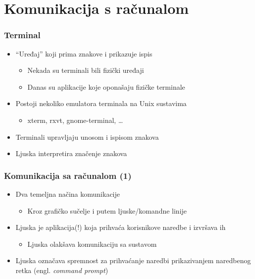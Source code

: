 \documentclass{beamer}
\begin{document}
\section{Komunikacija s računalom}
\begin{frame}[t]
\frametitle{Terminal}
\begin{itemize}
  \item ``Uređaj'' koji prima znakove i prikazuje ispis
  \begin{itemize}
    \item Nekada su terminali bili fizički uređaji
    \item Danas su aplikacije koje oponašaju fizičke terminale
  \end{itemize}
  \item Postoji nekoliko emulatora terminala na Unix sustavima
  \begin{itemize}
    \item xterm, rxvt, gnome-terminal, \ldots
  \end{itemize}
  \item Terminali upravljaju unosom i ispisom znakova
  \item Ljuska interpretira značenje znakova
\end{itemize}
\end{frame}

\begin{frame}[t]
\frametitle{Komunikacija sa računalom (1)}
\begin{itemize}
  \item Dva temeljna načina komunikacije
  \begin{itemize}
    \item Kroz grafičko sučelje i putem ljuske/komandne linije
  \end{itemize}
  \item Ljuska je aplikacija(!) koja prihvaća korisnikove naredbe i
        izvršava ih
  \begin{itemize}
    \item Ljuska olakšava komunikaciju sa sustavom
  \end{itemize}
  \item Ljuska označava spremnost za prihvaćanje naredbi prikazivanjem
        naredbenog retka (engl. \emph{command prompt})
\end{itemize}
\end{frame}
\end{document}
